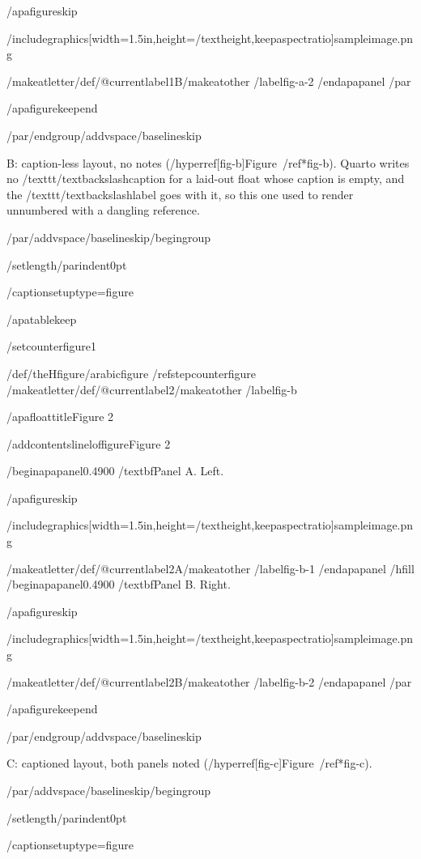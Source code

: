 /apafigureskip

/includegraphics[width=1.5in,height=/textheight,keepaspectratio]{sampleimage.png}

/makeatletter/def/@currentlabel{1B}/makeatother%
/label{fig-a-2}
/end{apapanel}%
/par

/apafigurekeepend

/par/endgroup/addvspace{/baselineskip}

B: caption-less layout, no notes
(/hyperref[fig-b]{Figure~/ref*{fig-b}}). Quarto writes no
/texttt{/textbackslash{}caption} for a laid-out float whose caption is
empty, and the /texttt{/textbackslash{}label} goes with it, so this one
used to render unnumbered with a dangling reference.

/par/addvspace{/baselineskip}/begingroup

/setlength{/parindent}{0pt}

/captionsetup{type=figure}

/apatablekeep

/setcounter{figure}{1}

/def/theHfigure{/arabic{figure}}%
/refstepcounter{figure}%
/makeatletter/def/@currentlabel{2}/makeatother%
/label{fig-b}

/apafloattitle{Figure 2}

/addcontentsline{lof}{figure}{Figure 2}

/begin{apapanel}{0.4900}%
/textbf{Panel A}. Left.

/apafigureskip

/includegraphics[width=1.5in,height=/textheight,keepaspectratio]{sampleimage.png}

/makeatletter/def/@currentlabel{2A}/makeatother%
/label{fig-b-1}
/end{apapanel}%
/hfill
/begin{apapanel}{0.4900}%
/textbf{Panel B}. Right.

/apafigureskip

/includegraphics[width=1.5in,height=/textheight,keepaspectratio]{sampleimage.png}

/makeatletter/def/@currentlabel{2B}/makeatother%
/label{fig-b-2}
/end{apapanel}%
/par

/apafigurekeepend

/par/endgroup/addvspace{/baselineskip}

C: captioned layout, both panels noted
(/hyperref[fig-c]{Figure~/ref*{fig-c}}).

/par/addvspace{/baselineskip}/begingroup

/setlength{/parindent}{0pt}

/captionsetup{type=figure}

